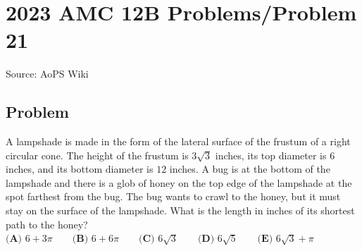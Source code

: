 \documentclass[12pt]{article}
\begin{document}
\section*{{2023 AMC 12B Problems/Problem 21}}
Source: AoPS Wiki

\subsection*{Problem}
A lampshade is made in the form of the lateral surface of the frustum of a right circular cone. The height of the frustum is $3\sqrt3$ inches, its top diameter is $6$ inches, and its bottom diameter is $12$ inches. A bug is at the bottom of the lampshade and there is a glob of honey on the top edge of the lampshade at the spot farthest from the bug. The bug wants to crawl to the honey, but it must stay on the surface of the lampshade. What is the length in inches of its shortest path to the honey? $\textbf{(A) } 6 + 3\pi\qquad \textbf{(B) }6 + 6\pi\qquad \textbf{(C) } 6\sqrt3 \qquad \textbf{(D) } 6\sqrt5 \qquad \textbf{(E) } 6\sqrt3 + \pi$
\end{document}

